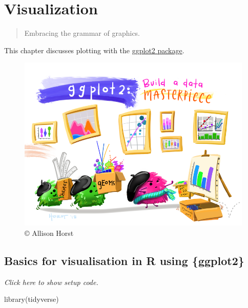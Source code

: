 \documentclass[]{book}
\newenvironment{Shaded}{}{}
\newcommand{\KeywordTok}[1]{\textcolor[rgb]{0.00,0.00,1.00}{#1}}
\newcommand{\NormalTok}[1]{#1}
\begin{document}
\hypertarget{vis-basics}{%
\chapter{Visualization}\label{vis-basics}}

\begin{quote}
Embracing the grammar of graphics.
\end{quote}

This chapter discusses plotting with the \href{https://ggplot2.tidyverse.org/}{ggplot2 package}.

\begin{figure}

\hfill{}\includegraphics[width=11.11in]{img/ggplot2_masterpiece} 

\caption{© Allison Horst}\label{fig:unnamed-chunk-6}
\end{figure}

\hypertarget{basics-for-visualisation-in-r-using-ggplot2}{%
\section{Basics for visualisation in R using \{ggplot2\}}\label{basics-for-visualisation-in-r-using-ggplot2}}

\emph{Click here to show setup code.}

\begin{Shaded}
\begin{Highlighting}[]
\KeywordTok{library}\NormalTok{(tidyverse)}
\end{Highlighting}
\end{Shaded}
\end{document}

